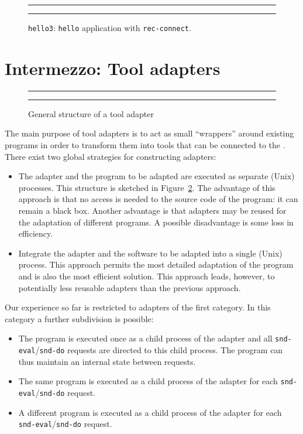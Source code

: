 \begin{figure}[tb]
\rule{\textwidth}{0.5mm}

  \caption{{\tt hello3}: {\tt hello} application with {\tt rec-connect}.}
  \label{fig:hello3.tb}
\rule{\textwidth}{0.5mm}
\end{figure}

\section{Intermezzo: Tool adapters}
\begin{figure}[t]
\rule{\textwidth}{0.5mm}
  
  \centerline{\box\graph}
  \caption{General structure of a tool adapter}
  \label{fig:adapter}
\rule{\textwidth}{0.5mm}
\end{figure}

The main purpose of tool adapters is to act as small ``wrappers'' around
existing programs in order to transform them into tools that
can be connected to the \TB. There exist two global strategies
for constructing adapters:

\begin{itemize}
\item The adapter and the program to be adapted are executed as separate
(Unix) processes. This structure is sketched in Figure~\ref{fig:adapter}.
The advantage of this approach is that no access is
needed to the source code of the program: it can remain a black box.
Another advantage is that adapters may be reused for the adaptation of
different programs. A possible disadvantage is some loss in
efficiency.

\item Integrate the adapter and the software to be adapted into a single
(Unix) process. This approach permits the most detailed adaptation of
the program and is also the most efficient solution. This approach
leads, however, to potentially less reusable adapters than the
previous approach.

\end{itemize}

Our experience so far is restricted to adapters of the first category.
In this category a further subdivision is possible:
\begin{itemize}
\item The program is executed once as a child process of the adapter
and all {\tt snd-eval}/{\tt snd-do} requests are directed to this child process.
The program can thus maintain an internal state between requests.

\item The same program is executed as a child process of the adapter
for each {\tt snd-eval}/{\tt snd-do} request.

\item A different program is executed as a child process of the adapter
for each {\tt snd-eval}/{\tt snd-do} request.

\end{itemize}

